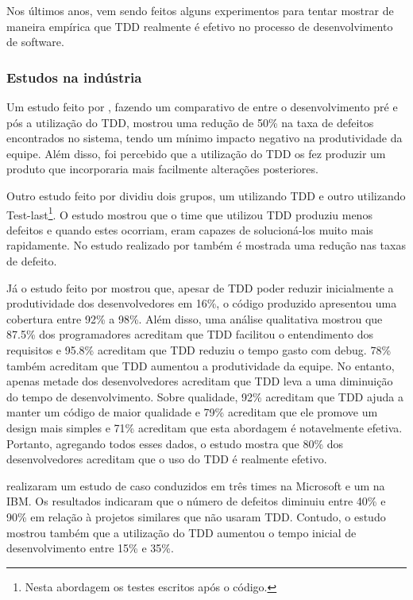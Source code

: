 Nos últimos anos, vem sendo feitos alguns experimentos para tentar mostrar de maneira empírica que TDD realmente é efetivo no processo de desenvolvimento de software.

\subsubsection{Estudos na indústria} %
\label{sub:estudos_na_industria}

Um estudo feito por , fazendo um comparativo de entre o desenvolvimento pré e pós a utilização do TDD, mostrou uma redução de 50\% na taxa de defeitos encontrados no sistema, tendo um mínimo impacto negativo na produtividade da equipe. Além disso, foi percebido que a utilização do TDD os fez produzir um produto que incorporaria mais facilmente alterações posteriores.

Outro estudo feito por  dividiu dois grupos, um utilizando TDD e outro utilizando Test-last\footnote{Nesta abordagem os testes escritos após o código.}. O estudo mostrou que o time que utilizou TDD produziu menos defeitos e quando estes ocorriam, eram capazes de solucioná-los muito mais rapidamente. No estudo realizado por  também é mostrada uma redução nas taxas de defeito.

Já o estudo feito por  mostrou que, apesar de TDD poder reduzir inicialmente a produtividade dos desenvolvedores em 16\%, o código produzido apresentou uma cobertura entre 92\% a 98\%. Além disso, uma análise qualitativa mostrou que 87.5\% dos programadores acreditam que TDD facilitou o entendimento dos requisitos e 95.8\% acreditam que TDD reduziu o tempo gasto com debug. 78\% também acreditam que TDD aumentou a produtividade da equipe. No entanto, apenas metade dos desenvolvedores acreditam que TDD leva a uma diminuição do tempo de desenvolvimento. Sobre qualidade, 92\% acreditam que TDD ajuda a manter um código de maior qualidade e 79\% acreditam que ele promove um design mais simples e 71\% acreditam que esta abordagem é notavelmente efetiva. Portanto, agregando todos esses dados, o estudo mostra que 80\% dos desenvolvedores acreditam que o uso do TDD é realmente efetivo.

 realizaram um estudo de caso conduzidos em três times na Microsoft e um na IBM. Os resultados indicaram que o número de defeitos diminuiu entre 40\% e 90\% em relação à projetos similares que não usaram TDD. Contudo, o estudo mostrou também que a utilização do TDD aumentou o tempo inicial de desenvolvimento entre 15\% e 35\%.

